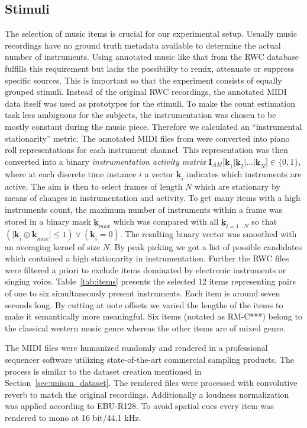 \subsection{Stimuli}
The selection of music items is crucial for our experimental setup. Usually music recordings have no ground truth metadata available to determine the actual number of instruments. Using annotated music like that from the RWC database~\cite{rwc} fulfills this requirement but lacks the possibility to remix, attenuate or suppress specific sources. This is important so that the experiment consists of equally grouped stimuli. Instead of the original RWC recordings, the annotated MIDI data itself was used as prototypes for the stimuli.
To make the count estimation task less ambiguous for the subjects, the instrumentation was chosen to be mostly constant during the music piece.
Therefore we calculated an ``instrumental stationarity'' metric.
The annotated MIDI files from \cite{rwc} were converted into piano roll representations for each instrument channel. This representation was then converted into a binary \emph{instrumentation activity matrix} $\mathbf{I}_{AM}\lbrack \mathbf{\underline{k}}_1 \vert \mathbf{\underline{k}}_2 \vert  ... \vert \mathbf{\underline{k}}_N \rbrack \in \{0,1\}$, where at each discrete time instance $i$ a vector $\mathbf{\underline{k}}_i$ indicates which instruments are active. The aim is then to select frames of length $N$ which are stationary by means of changes in instrumentation and activity. To get many items with a high instruments count, the maximum number of instruments within a frame was stored in a binary mask $\mathbf{\underline{k}}_{max}$ which was compared with all $\mathbf{\underline{k}}_{i=1...N}$ so that $(\vert\mathbf{\underline{k}}_{i} \oplus \mathbf{\underline{k}}_{max}\vert \leq 1) \lor (\mathbf{\underline{k}}_{i} = \underline{0})$. The resulting binary vector was smoothed with an averaging kernel of size $N$. By peak picking we got a list of possible candidates which contained a high stationarity in instrumentation.
Further the RWC files were filtered a priori to exclude items dominated by electronic instruments or singing voice. Table~\ref{tab:items} presents the selected 12 items representing pairs of one to six simultaneously present instruments. Each item is around seven seconds long. By cutting at note offsets we varied the lengths of the items to make it semantically more meaningful. Six items (notated as RM-C***) belong to the classical western music genre whereas the other items are of mixed genre.
\par
The MIDI files were humanized randomly and rendered in a professional sequencer software utilizing state-of-the-art commercial sampling products.
The process is similar to the dataset creation mentioned in Section~\ref{sec:unison_dataset}.
The rendered files were processed with convolutive reverb to match the original recordings. 
Additionally a loudness normalization was applied according to EBU-R128\cite{EBU2011}. To avoid spatial cues every item was rendered to mono at 16 bit/44.1 kHz.

